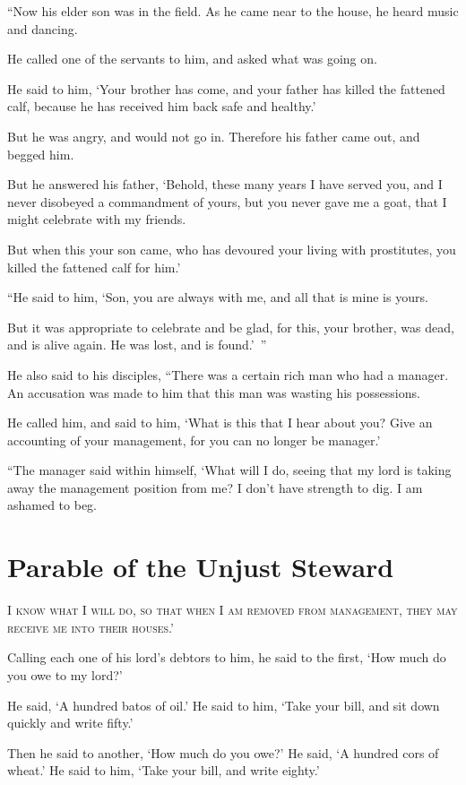 “Now his elder son was in the field. As he came near to the house, he heard music and dancing.

He called one of the servants to him, and asked what was going on.

He said to him, ‘Your brother has come, and your father has killed the fattened calf, because he has received him back safe and healthy.’

But he was angry, and would not go in. Therefore his father came out, and begged him.

But he answered his father, ‘Behold, these many years I have served you, and I never disobeyed a commandment of yours, but you never gave me a goat, that I might celebrate with my friends.

But when this your son came, who has devoured your living with prostitutes, you killed the fattened calf for him.’

“He said to him, ‘Son, you are always with me, and all that is mine is yours.

But it was appropriate to celebrate and be glad, for this, your brother, was dead, and is alive again. He was lost, and is found.’ ”

He also said to his disciples, “There was a certain rich man who had a manager. An accusation was made to him that this man was wasting his possessions.

He called him, and said to him, ‘What is this that I hear about you? Give an accounting of your management, for you can no longer be manager.’

“The manager said within himself, ‘What will I do, seeing that my lord is taking away the management position from me? I don’t have strength to dig. I am ashamed to beg.


\clearpage \section*{Parable of the Unjust Steward}

\lettrine{I}{ know what I will do, so that when I am removed from management, they may receive me into their houses.’}

Calling each one of his lord’s debtors to him, he said to the first, ‘How much do you owe to my lord?’

He said, ‘A hundred batos of oil.’ He said to him, ‘Take your bill, and sit down quickly and write fifty.’

Then he said to another, ‘How much do you owe?’ He said, ‘A hundred cors of wheat.’ He said to him, ‘Take your bill, and write eighty.’

